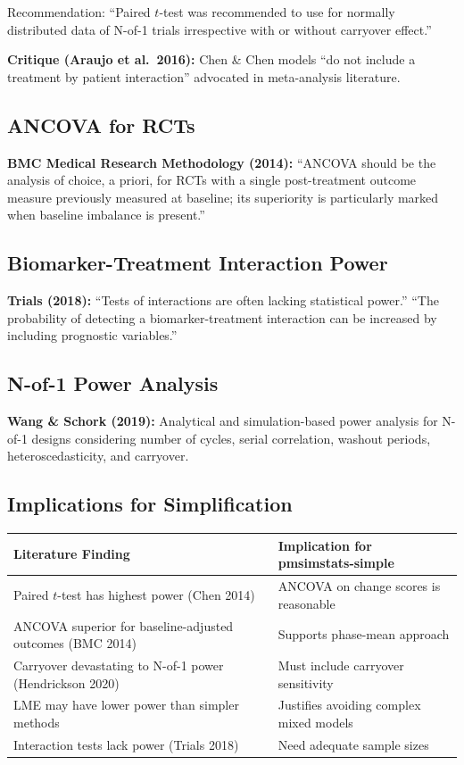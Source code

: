 \documentclass[11pt,letterpaper]{article}
\begin{document}
Recommendation: ``Paired $t$-test was recommended to use for normally
distributed data of N-of-1 trials irrespective with or without
carryover effect.''

\textbf{Critique (Araujo et al.\ 2016):} Chen \& Chen models ``do not
include a treatment by patient interaction'' advocated in meta-analysis
literature.

\subsection{ANCOVA for RCTs}

\textbf{BMC Medical Research Methodology (2014):} ``ANCOVA should be the
analysis of choice, a priori, for RCTs with a single post-treatment
outcome measure previously measured at baseline; its superiority is
particularly marked when baseline imbalance is present.''

\subsection{Biomarker-Treatment Interaction Power}

\textbf{Trials (2018):} ``Tests of interactions are often lacking
statistical power.'' ``The probability of detecting a biomarker-treatment
interaction can be increased by including prognostic variables.''

\subsection{N-of-1 Power Analysis}

\textbf{Wang \& Schork (2019):} Analytical and simulation-based power
analysis for N-of-1 designs considering number of cycles, serial
correlation, washout periods, heteroscedasticity, and carryover.

\subsection{Implications for Simplification}

\begin{table}[h]
\centering\small
\begin{tabular}{@{}L{6.5cm}L{7cm}@{}}
\toprule
Literature Finding & Implication for pmsimstats-simple \\
\midrule
Paired $t$-test has highest power (Chen 2014) & ANCOVA on change scores is reasonable \\
ANCOVA superior for baseline-adjusted outcomes (BMC 2014) & Supports phase-mean approach \\
Carryover devastating to N-of-1 power (Hendrickson 2020) & Must include carryover sensitivity \\
LME may have lower power than simpler methods & Justifies avoiding complex mixed models \\
Interaction tests lack power (Trials 2018) & Need adequate sample sizes \\
\bottomrule
\end{tabular}
\end{table}
\end{document}
